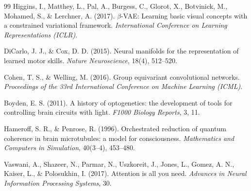 \documentclass[11pt]{article}
\begin{document}
\begin{thebibliography}{99}
Higgins, I., Matthey, L., Pal, A., Burgess, C., Glorot, X., Botvinick, M., Mohamed, S., \& Lerchner, A. (2017). $\beta$-VAE: Learning basic visual concepts with a constrained variational framework. \emph{International Conference on Learning Representations (ICLR)}.

DiCarlo, J. J., \& Cox, D. D. (2015). Neural manifolds for the representation of learned motor skills. \emph{Nature Neuroscience}, 18(4), 512--520.

Cohen, T. S., \& Welling, M. (2016). Group equivariant convolutional networks. \emph{Proceedings of the 33rd International Conference on Machine Learning (ICML)}.

Boyden, E. S. (2011). A history of optogenetics: the development of tools for controlling brain circuits with light. \emph{F1000 Biology Reports}, 3, 11.

Hameroff, S. R., \& Penrose, R. (1996). Orchestrated reduction of quantum coherence in brain microtubules: a model for consciousness. \emph{Mathematics and Computers in Simulation}, 40(3--4), 453--480.

Vaswani, A., Shazeer, N., Parmar, N., Uszkoreit, J., Jones, L., Gomez, A. N., Kaiser, L., \& Polosukhin, I. (2017). Attention is all you need. \emph{Advances in Neural Information Processing Systems}, 30.

\end{thebibliography}
\end{document}
